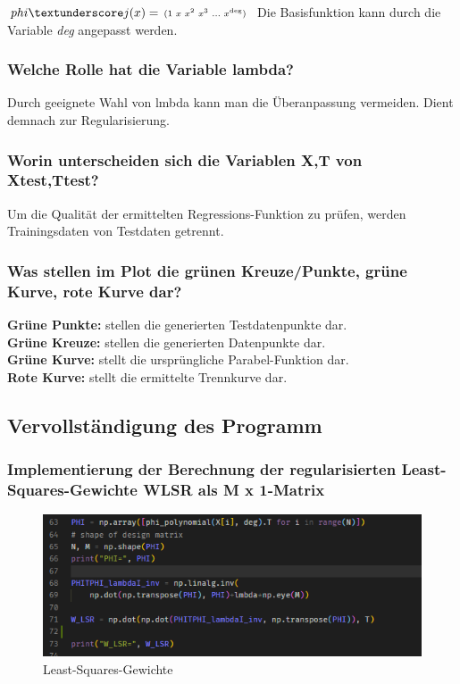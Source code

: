 $phi\textunderscore j (x) = \begin{smallmatrix}(1&x&x^2&x^3&...&x^\mathrm{deg})\end{smallmatrix}$
Die Basisfunktion kann durch die Variable \textit{deg} angepasst werden.

\subsubsection{Welche Rolle hat die Variable lambda?}
Durch geeignete Wahl von lmbda kann man die Überanpassung vermeiden.
Dient demnach zur Regularisierung.

\subsubsection{Worin unterscheiden sich die Variablen X,T von X\textunderscore test,T\textunderscore test?}
Um die Qualität der ermittelten Regressions-Funktion zu prüfen, werden Trainingsdaten von Testdaten getrennt.

\subsubsection{Was stellen im Plot die grünen Kreuze/Punkte, grüne Kurve, rote Kurve dar?}
\textbf{Grüne Punkte:} stellen die generierten Testdatenpunkte dar.\\
\textbf{Grüne Kreuze:} stellen die generierten Datenpunkte dar.\\
\textbf{Grüne Kurve:} stellt die ursprüngliche Parabel-Funktion dar.\\
\textbf{Rote Kurve:} stellt die ermittelte Trennkurve dar.

\subsection{Vervollständigung des Programm}

\subsubsection{Implementierung der Berechnung der regularisierten Least-Squares-Gewichte W\textunderscore LSR als M x 1-Matrix}

\begin{figure}[H]
    \centering
    \includegraphics[width=1\linewidth]{sections/v2a1_wlsr_impl.png}
    \caption{Least-Squares-Gewichte}
\end{figure}


